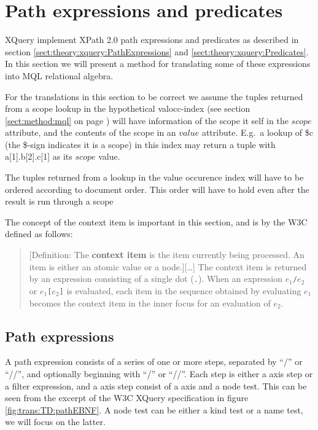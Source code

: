 \section{Path expressions and predicates}
\label{sect:trans:TD:pathNpred}

XQuery implement XPath 2.0 path expressions and predicates as described in section
\ref{sect:theory:xquery:PathExpressions} and \ref{sect:theory:xquery:Predicates}. In this section we will present
a method for translating some of these expressions into MQL relational algebra.

For the translations in this section to be correct we assume the tuples returned from a scope lookup in the
hypothetical \textsf{valocc}-index (see section \ref{sect:method:mql} on page \pageref{sect:method:mql}) will have
information of the scope it self in the $scope$ attribute, and the contents of the scope in an $value$ attribute.
E.g.\ a lookup of \textsf{\$c} (the \textsf{\$}-sign indicates it is a scope) in this index may return a tuple
with \textsf{a[1].b[2].c[1]} as its $scope$ value.

The tuples returned from a lookup in the value occurence index will have to be ordered according to document
order. This order will have to hold even after the result is run through a \textsf{scope}

The concept of the context item is important in this section, and is by the W3C defined as follows\cite{w3c00}:
\begin{quote}
[Definition: The \textbf{context item} is the item currently being processed. An item is either an atomic value or
a node.][\ldots] The context item is returned by an expression consisting of a single dot (\texttt{.}). When an
expression $e_1$\texttt{/}$e_2$ or $e_1$\texttt{[}$e_2$\texttt{]} is evaluated, each item in the sequence obtained
by evaluating $e_1$ becomes the context item in the inner focus for an evaluation of $e_2$.
\end{quote}

\subsection{Path expressions}
\label{sect:trans:TD:pathExprs}
A path expression consists of a series of one or more steps, separated by ``/'' or ``//'', and optionally beginning
with ``/'' or ``//''.  Each step is either a axis step or a filter expression, and a axis step consist of a axis
and a node test. This can be seen from the excerpt of the W3C XQuery
specification in figure \ref{fig:trans:TD:pathEBNF}. A node test can be either a kind test or a name test, we will focus on the latter. 

